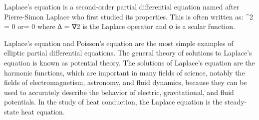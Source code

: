 Laplace's equation is a second-order partial differential equation named after Pierre-Simon Laplace who first studied its properties. This is often written as:
\nabla^2 \varphi = 0 \qquad\mbox{or}\qquad \Delta\varphi = 0
where ∆ = ∇2 is the Laplace operator and φ is a scalar function.

Laplace's equation and Poisson's equation are the most simple examples of elliptic partial differential equations. The general theory of solutions to Laplace's equation is known as potential theory. The solutions of Laplace's equation are the harmonic functions, which are important in many fields of science, notably the fields of electromagnetism, astronomy, and fluid dynamics, because they can be used to accurately describe the behavior of electric, gravitational, and fluid potentials. In the study of heat conduction, the Laplace equation is the steady-state heat equation.
